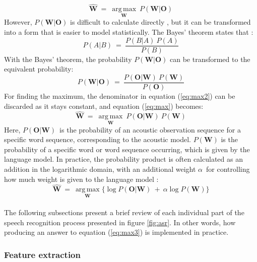 \documentclass[english, 12pt, a4paper, pdftex, elec, utf8]{aaltothesis}
\DeclareMathOperator*{\argmax}{arg\,max}
\begin{document}
\begin{equation} \label{eq:max}
\hat{\bm{W}} \ = \ \underset{\bm{W}}{\argmax} \ P(\bm{W} | \bm{O})
\end{equation}
However, $P(\bm{W} | \bm{O})$ is difficult to calculate directly \cite{gales2008application}, but it can be transformed into a form that is easier to model statistically. The Bayes' theorem states that \cite[p.~10]{hori2013speech}:
\begin{equation}
P(A | B) \ = \ \frac{P(B | A) \ P(A)}{P(B)}
\end{equation}
With the Bayes' theorem, the probability $P(\bm{W} | \bm{O})$ can be transformed to the equivalent probability:
\begin{equation} \label{eq:max2}
P(\bm{W} | \bm{O}) \ = \ \frac{P(\bm{O} | \bm{W}) \ P(\bm{W})}{P(\bm{O})}
\end{equation}
For finding the maximum, the denominator in equation (\ref{eq:max2}) can be discarded as it stays constant, and equation (\ref{eq:max}) becomes:
\begin{equation} \label{eq:max3}
\hat{\bm{W}} \ = \ \underset{\bm{W}}{\argmax} \ P(\bm{O} | \bm{W}) \ P(\bm{W})
\end{equation}
Here, $P(\bm{O} | \bm{W})$ is the probability of an acoustic observation sequence for a specific word sequence, corresponding to the acoustic model. $P(\bm{W})$ is the probability of a specific word or word sequence occurring, which is given by the language model. In practice, the probability product is often calculated as an addition in the logarithmic domain, with an additional weight $\alpha$ for controlling how much weight is given to the language model \cite[p.~200]{gales2008application}:
\begin{equation}
\hat{\bm{W}} \ = \ \underset{\bm{W}}{\argmax} \big\{ \log P(\bm{O} | \bm{W}) \ + \ \alpha \log P(\bm{W}) \big\}
\end{equation} \\
The following subsections present a brief review of each individual part of the speech recognition process presented in figure \ref{fig:asr}. In other words, how producing an answer to equation (\ref{eq:max3}) is implemented in practice.

\subsubsection{Feature extraction}
\end{document}
